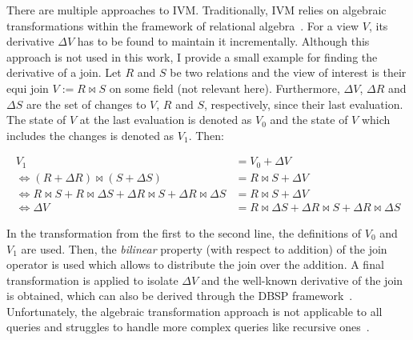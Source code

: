 There are multiple approaches to \ac{IVM}.
Traditionally, \ac{IVM} relies on algebraic transformations within the framework
of relational algebra~\cite{gupta1995maintenance, gupta1993maintaining, pgivm}.
For a view \(V\), its derivative \(\Delta V\) has to be found to maintain
it incrementally.
Although this approach is not used in this work, I provide a small example
for finding the derivative of a join.
Let \(R\) and \(S\) be two relations and the view of interest is their
equi join \(V := R \bowtie S\) on some field (not relevant here).
Furthermore, \(\Delta V\), \(\Delta R\) and \(\Delta S\) are the set of changes
to \(V\), \(R\) and \(S\), respectively, since their last evaluation.
The state of \(V\) at the last evaluation is denoted as \(V_0\) and the
state of \(V\) which includes the changes is denoted as \(V_1\). Then:

\begin{equation}
	\begin{aligned}
		V_1                                                                                               & = V_0 + \Delta V                                                      \\
		\Leftrightarrow (R + \Delta R) \bowtie (S + \Delta S)                                             & = R \bowtie S + \Delta V                                              \\
		\Leftrightarrow R \bowtie S + R \bowtie \Delta S + \Delta R \bowtie S + \Delta R \bowtie \Delta S & = R \bowtie S + \Delta V                                              \\
		\Leftrightarrow \Delta V                                                                          & = R \bowtie \Delta S + \Delta R \bowtie S + \Delta R \bowtie \Delta S
	\end{aligned}
\end{equation}

In the transformation from the first to the second line, the definitions
of \(V_0\) and \(V_1\) are used.
Then, the \emph{bilinear} property (with respect to addition) of the join
operator is used which allows to distribute the join over the addition.
A final transformation is applied to isolate \(\Delta V\) and the well-known
derivative of the join~\cite{idris2017dynamic} is obtained, which can also be
derived through the DBSP framework~\cite{budiu2025dbsp}.
Unfortunately, the algebraic transformation approach is not applicable
to all queries and struggles to handle more complex queries like
recursive ones~\cite{budiu2025dbsp}.

